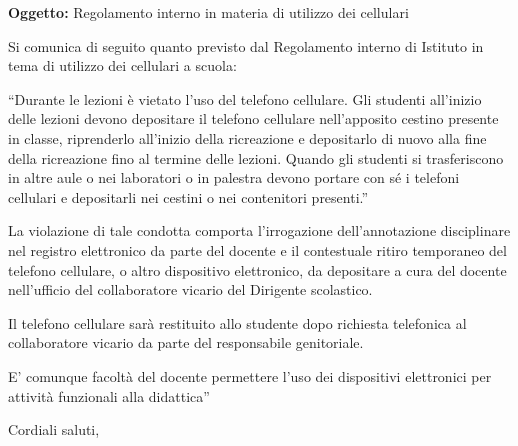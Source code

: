 \documentclass[12pt,a4paper]{letter}
\date{22 settembre 2025}
\begin{document}
\begin{letter}{\textbf{Oggetto:} Regolamento interno in materia di utilizzo dei cellulari}

\opening{Si comunica di seguito quanto previsto dal Regolamento interno di Istituto in tema di utilizzo dei cellulari a scuola:}

“Durante le lezioni è vietato l’uso del telefono cellulare. Gli studenti all’inizio delle lezioni devono depositare il telefono cellulare nell’apposito cestino presente in classe, riprenderlo all’inizio della ricreazione e depositarlo di nuovo alla fine della ricreazione fino al termine delle lezioni.
Quando gli studenti si trasferiscono in altre aule o nei laboratori o in palestra devono portare con sé i telefoni cellulari e depositarli nei cestini o nei contenitori presenti.”

La violazione di tale condotta comporta l’irrogazione dell’annotazione disciplinare nel registro elettronico da parte del docente e il contestuale ritiro temporaneo del telefono cellulare, o altro dispositivo elettronico, da depositare a cura del docente nell’ufficio del collaboratore vicario del Dirigente scolastico.

Il telefono cellulare sarà restituito allo studente dopo richiesta telefonica al collaboratore vicario da parte del responsabile genitoriale.

E’ comunque facoltà del docente permettere l’uso dei dispositivi elettronici per attività funzionali
alla didattica”

\vspace{1 cm}

\closing{Cordiali saluti,}

\end{letter}
\end{document}
